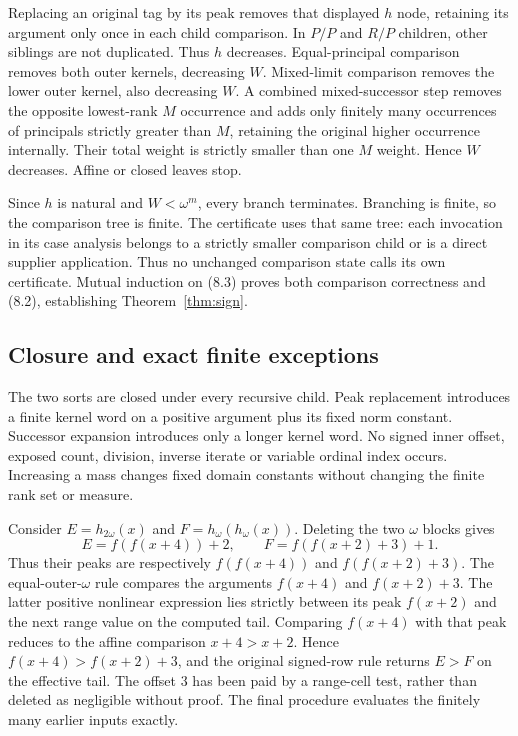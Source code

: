 \documentclass[11pt,a4paper]{article}
\begin{document}
Replacing an original tag by its peak removes that displayed $h$ node,
retaining its argument only once in each child comparison. In $P/P$ and
$R/P$ children, other siblings are not duplicated. Thus $h$ decreases.
Equal-principal comparison removes both outer kernels, decreasing $W$.
Mixed-limit comparison removes the lower outer kernel, also decreasing $W$.
A combined mixed-successor step removes the opposite lowest-rank $M$
occurrence and adds only finitely many occurrences of principals strictly
greater than $M$, retaining the original higher occurrence internally.
Their total weight is strictly smaller than one $M$ weight. Hence $W$
decreases. Affine or closed leaves stop.

Since $h$ is natural and $W<\omega^m$, every branch terminates. Branching
is finite, so the comparison tree is finite. The certificate uses that
same tree: each invocation in its case analysis belongs to a strictly
smaller comparison child or is a direct supplier application. Thus no
unchanged comparison state calls its own certificate. Mutual induction
on (8.3) proves both comparison correctness and (8.2), establishing
Theorem~\ref{thm:sign}.

\subsection{Closure and exact finite exceptions}
The two sorts are closed under every recursive child. Peak replacement
introduces a finite kernel word on a positive argument plus its fixed
norm constant. Successor expansion introduces only a longer kernel word.
No signed inner offset, exposed count, division, inverse iterate or
variable ordinal index occurs. Increasing a mass changes fixed domain
constants without changing the finite rank set or measure.

\begin{example}
Consider $E=h_{2\omega}(x)$ and $F=h_\omega(h_\omega(x))$.
Deleting the two $\omega$ blocks gives
\[
 E=f(f(x+4))+2,\qquad F=f(f(x+2)+3)+1.
\]
Thus their peaks are respectively $f(f(x+4))$ and
$f(f(x+2)+3)$. The equal-outer-$\omega$ rule compares the arguments
$f(x+4)$ and $f(x+2)+3$. The latter positive nonlinear expression lies
strictly between its peak $f(x+2)$ and the next range value on the
computed tail. Comparing $f(x+4)$ with that peak reduces to the affine
comparison $x+4>x+2$. Hence $f(x+4)>f(x+2)+3$, and the original signed-row
rule returns $E>F$ on the effective tail. The offset $3$ has been paid
by a range-cell test, rather than deleted as negligible without proof.
The final procedure evaluates the finitely many earlier inputs exactly.
\end{example}
\end{document}
